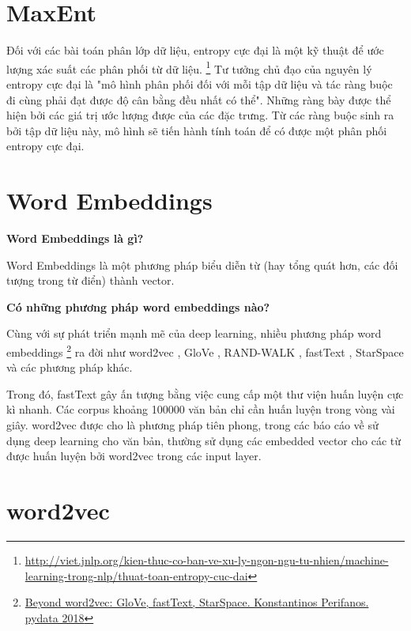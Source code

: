 \documentclass[11pt,a4paper]{article}
\begin{document}
\section{MaxEnt}

Đối với các bài toán phân lớp dữ liệu, entropy cực đại là một kỹ thuật để ước lượng xác suất các phân phối từ dữ liệu.
\footnote{\href{http://viet.jnlp.org/kien-thuc-co-ban-ve-xu-ly-ngon-ngu-tu-nhien/machine-learning-trong-nlp/thuat-toan-entropy-cuc-dai}{http://viet.jnlp.org/kien-thuc-co-ban-ve-xu-ly-ngon-ngu-tu-nhien/machine-learning-trong-nlp/thuat-toan-entropy-cuc-dai}}
Tư tưởng chủ đạo của nguyên lý entropy cực đại là "mô hình phân phối đối với mỗi tập dữ liệu và tác ràng buộc đi cùng phải đạt được độ cân bằng đều nhất có thể".
Những ràng bày được thể hiện bởi các giá trị ước lượng được của các đặc trưng. Từ các ràng buộc sinh ra bởi tập dữ liệu này, mô hình sẽ tiến hành tính toán để có được một phân phối entropy cực đại.

\section{Word Embeddings}

\textbf{Word Embeddings là gì?}

Word Embeddings là một phương pháp biểu diễn từ (hay tổng quát hơn, các đối tượng trong từ điển) thành vector.

\textbf{Có những phương pháp word embeddings nào?}

Cùng với sự phát triển mạnh mẽ của deep learning, nhiều phương pháp word embeddings \footnote{\href{https://pydata.org/london2018/schedule/presentation/29/}{Beyond word2vec: GloVe, fastText, StarSpace. Konstantinos Perifanos. pydata 2018}} ra đời như word2vec \cite{DBLP:conf/nips/MikolovSCCD13}, GloVe \cite{DBLP:conf/emnlp/PenningtonSM14}, RAND-WALK \cite{DBLP:journals/corr/AroraLLMR15}, fastText \cite{DBLP:conf/eacl/GraveMJB17}, StarSpace \cite{DBLP:conf/aaai/WuFCABW18} và các phương pháp khác.

Trong đó, fastText gây ấn tượng bằng việc cung cấp một thư viện huấn luyện cực kì nhanh. Các corpus khoảng 100000 văn bản chỉ cần huấn luyện trong vòng vài giây. word2vec được cho là phương pháp tiên phong, trong các báo cáo về sử dụng deep learning cho văn bản, thường sử dụng các embedded vector cho các từ được huấn luyện bởi word2vec trong các input layer.

\section{word2vec}
\end{document}
